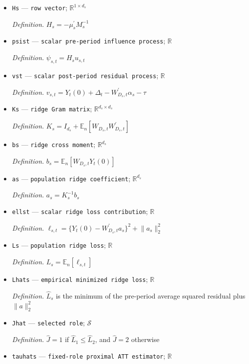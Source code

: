 \documentclass{article}
\begin{document}
\begin{itemize}
  \item \texttt{Hs} --- \texttt{row vector}; \(\mathbb R^{1\times d_s}\)
  \par\smallskip\noindent\emph{Definition.} \(H_s=-\mu_s^{\prime}M_s^{-1}\)
  \item \texttt{psist} --- \texttt{scalar pre-\allowbreak{}period influence process}; \(\mathbb R\)
  \par\smallskip\noindent\emph{Definition.} \(\psi_{s,t}=H_su_{s,t}\)
  \item \texttt{vst} --- \texttt{scalar post-\allowbreak{}period residual process}; \(\mathbb R\)
  \par\smallskip\noindent\emph{Definition.} \(v_{s,t}=Y_t(0)+\Delta_t-W_{D_s,t}^{\prime}\alpha_s-\tau\)
  \item \texttt{Ks} --- \texttt{ridge Gram matrix}; \(\mathbb R^{d_s\times d_s}\)
  \par\smallskip\noindent\emph{Definition.} \(K_s=I_{d_s}+\mathbb E_n[W_{D_s,t}W_{D_s,t}^{\prime}]\)
  \item \texttt{bs} --- \texttt{ridge cross moment}; \(\mathbb R^{d_s}\)
  \par\smallskip\noindent\emph{Definition.} \(b_s=\mathbb E_n[W_{D_s,t}Y_t(0)]\)
  \item \texttt{as} --- \texttt{population ridge coefficient}; \(\mathbb R^{d_s}\)
  \par\smallskip\noindent\emph{Definition.} \(a_s=K_s^{-1}b_s\)
  \item \texttt{ellst} --- \texttt{scalar ridge loss contribution}; \(\mathbb R\)
  \par\smallskip\noindent\emph{Definition.} \(\ell_{s,t}=\{Y_t(0)-W_{D_s,t}^{\prime}a_s\}^2+\lVert a_s\rVert_2^2\)
  \item \texttt{Ls} --- \texttt{population ridge loss}; \(\mathbb R\)
  \par\smallskip\noindent\emph{Definition.} \(L_s=\mathbb E_n[\ell_{s,t}]\)
  \item \texttt{Lhats} --- \texttt{empirical minimized ridge loss}; \(\mathbb R\)
  \par\smallskip\noindent\emph{Definition.} \(\widehat L_s\) is the minimum of the pre-period average squared residual plus \(\lVert a\rVert_2^2\)
  \item \texttt{Jhat} --- \texttt{selected role}; \(\mathcal S\)
  \par\smallskip\noindent\emph{Definition.} \(\widehat J=1\) if \(\widehat L_1\leq\widehat L_2\), and \(\widehat J=2\) otherwise
  \item \texttt{tauhats} --- \texttt{fixed-\allowbreak{}role proximal ATT estimator}; \(\mathbb R\)

\end{itemize}
\end{document}
